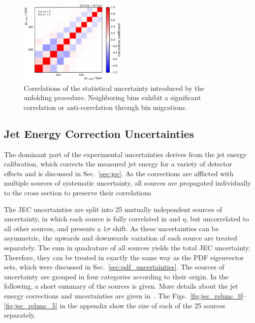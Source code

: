 \begin{figure}[htbp]
    \includegraphics[width=0.47\textwidth]{figures/measurement/unf_nlo_corr_yb2ys0.pdf}
    \caption[Correlations of statistical uncertainty]{Correlations of the
        statistical uncertainty introduced by the unfolding procedure.
        Neighboring bins exhibit a significant correlation or anti-correlation
        through bin migrations.}
    \label{fig:corr_unfolding_nlo}
\end{figure}

\subsection{Jet Energy Correction Uncertainties}

The dominant part of the experimental uncertainties derives from the jet energy
calibration, which corrects the measured jet energy for a variety of detector
effects and is discussed in Sec.~\ref{sec:jec}. As the corrections are afflicted
with multiple sources of systematic uncertainty, all sources are propagated
individually to the cross section to preserve their correlations.

The JEC uncertainties are split into 25 mutually independent sources of
uncertainty, in which each source is fully correlated in \pt and $\eta$,
but uncorrelated to all other sources, and presents a $1\sigma$
shift. As these uncertainties can be asymmetric, the upwards and downwards
variation of each source are treated separately. The sum in quadrature of all
sources yields the total JEC uncertainty. Therefore, they can be treated
in exactly the same way as the PDF eigenvector sets, which were discussed in
Sec.~\ref{sec:pdf_uncertainties}. The sources of uncertainty are grouped in four
categories according to their origin. In the following, a short summary of the
sources is given. More details about the jet energy corrections and
uncertainties are given in~\cite{jec_8tev}. The
Figs.~\ref{fig:jec_relunc_0}--\ref{fig:jec_relunc_5} in the appendix show the
size of each of the 25 sources separately.

